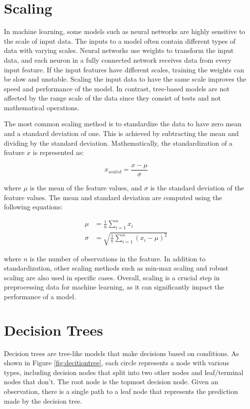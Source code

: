 \section{Scaling}

In machine learning, some models such as neural networks are highly sensitive to the scale of input data.
The inputs to a model often contain different types of data with varying scales.
Neural networks use weights to transform the input data, and each neuron in a fully connected network receives data from every input feature.
If the input features have different scales, training the weights can be slow and unstable.
Scaling the input data to have the same scale improves the speed and performance of the model.
In contrast, tree-based models are not affected by the range scale of the data since they consist of tests and not mathematical operations.

The most common scaling method is to standardize the data to have zero mean and a standard deviation of one.
This is achieved by subtracting the mean and dividing by the standard deviation.
Mathematically, the standardization of a feature $x$ is represented as:

\begin{equation}
x_{scaled} = \frac{x - \mu}{\sigma}
\end{equation}

where $\mu$ is the mean of the feature values, and $\sigma$ is the standard deviation of the feature values.
The mean and standard deviation are computed using the following equations:

\begin{align}
\mu &= \frac{1}{n}\sum_{i=1}^{n}x_i\\
\sigma &= \sqrt{\frac{1}{n}\sum_{i=1}^{n}(x_i - \mu)^2}
\end{align}

where $n$ is the number of observations in the feature.
In addition to standardization, other scaling methods such as min-max scaling and robust scaling are also used in specific cases.
Overall, scaling is a crucial step in preprocessing data for machine learning, as it can significantly impact the performance of a model.



\section{Decision Trees}
Decision trees are tree-like models that make decisions based on conditions.
As shown in Figure \ref{fig:decitiontree}, each circle represents a node with various types, including decision nodes that split into two other nodes and leaf/terminal nodes that don't.
The root node is the topmost decision node.
Given an observation, there is a single path to a leaf node that represents the prediction made by the decision tree.

